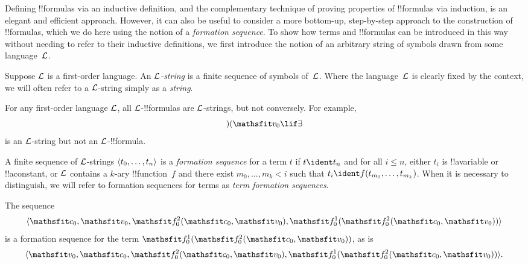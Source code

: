 \documentclass[../../../include/open-logic-section]{subfiles}
\begin{document}


Defining !!{formula}s via an inductive definition, and the
complementary technique of proving properties of !!{formula}s via
induction, is an elegant and efficient approach. However, it can
also be useful to consider a more bottom-up, step-by-step approach
to the construction of !!{formula}s, which we do here using the
notion of a \emph{formation sequence}.
%
To show how terms and !!{formula}s can be introduced in this way
without needing to refer to their inductive definitions, we first
introduce the notion of an arbitrary string of symbols drawn from
some language~$\Lang L$.

\begin{defn}[Strings]
Suppose $\Lang L$ is a first-order language. An \emph{$\Lang
L$-string} is a finite sequence of symbols of~$\Lang L$. Where the
language~$\Lang L$ is clearly fixed by the context, we will often
refer to a $\Lang L$-string simply as a \emph{string}.
\end{defn}

\begin{ex}
For any first-order language $\Lang L$, all
$\Lang L$-!!{formula}s are $\Lang L$-strings, but not
conversely. For example, \[)(\Obj v_0\lif\lexists\] is an
$\Lang L$-string but not an $\Lang L$-!!{formula}.
\end{ex}

\begin{defn}
A finite sequence of $\Lang L$-strings $\langle t_0,\dotsc,t_n \rangle$ is a
\emph{formation sequence} for a term $t$ if $t \ident t_n$ and for all
$i \leq n$, either $t_i$ is !!a{variable} or !!a{constant}, or $\Lang
L$ contains a $k$-ary !!{function}~$f$ and there exist
$m_0,\dotsc,m_k < i$ such that $t_i \ident f(t_{m_0},\dotsc,t_{m_k})$.
When it is necessary to distinguish, we will refer to formation
sequences for terms as \emph{term formation sequences}.
\end{defn}

\begin{ex}
The sequence
\[
    \tuple{\Obj c_0, \Obj v_0, \Atom{\Obj f^2_0}{\Obj c_0, \Obj v_0}, \Atom{\Obj f^1_0}{\Atom{\Obj f^2_0}{\Obj c_0, \Obj v_0}}}
\]
is a formation sequence for the term $\Atom{\Obj f^1_0}{\Atom{\Obj
f^2_0}{\Obj c_0, \Obj v_0}}$, as is
\[
    \tuple{\Obj v_0, \Obj c_0, \Atom{\Obj f^2_0}{\Obj c_0, \Obj v_0}, \Atom{\Obj f^1_0}{\Atom{\Obj f^2_0}{\Obj c_0, \Obj v_0}}}.
\]
\end{ex}
\end{document}
